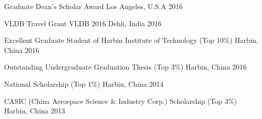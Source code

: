 \begin{cvhonors}
  \cvhonor
	{Graduate Dean's Scholar Award}
	{}
	{Los Angeles, U.S.A}
	{2016}
	
	
  \cvhonor
	{VLDB Travel Grant}
	{VLDB 2016}
	{Dehli, India}
	{2016}
	
  \cvhonor
   {Excellent Graduate Student of Harbin Institute of Technology}
   {(Top 10\%)}
   {Harbin, China}
   {2016}
   
  \cvhonor
   {Outstanding Undergraduate Graduation Thesis}
   {(Top 3\%)}
   {Harbin, China}
   {2016}
   
  \cvhonor
   {National Scholarship}
   {(Top 1\%)}
   {Harbin, China}
   {2014}
   
   
  \cvhonor
   {CASIC (China Aerospace Science \& Industry Corp.) Scholarship}
   {(Top 3\%)}
   {Harbin, China}
   {2013}



    



    


\end{cvhonors}
